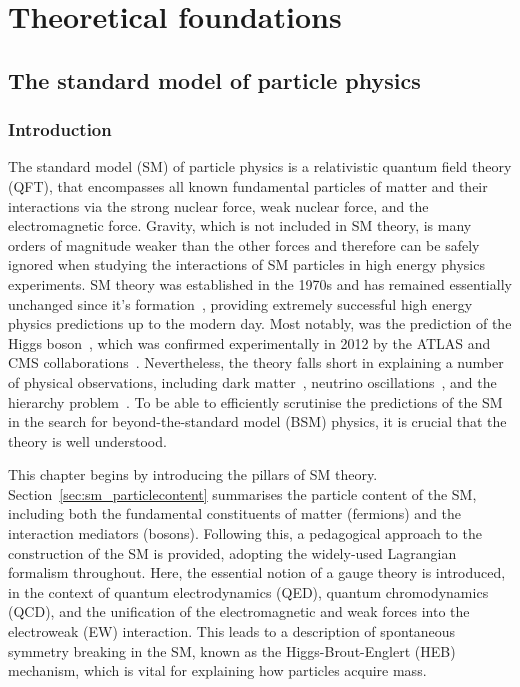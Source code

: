 \chapter{Theoretical foundations}
\label{chap:theory}

\section{The standard model of particle physics}
\subsection{Introduction}

The standard model (SM) of particle physics is a relativistic quantum field theory (QFT), that encompasses all known fundamental particles of matter and their interactions via the strong nuclear force, weak nuclear force, and the electromagnetic force. Gravity, which is not included in SM theory, is many orders of magnitude weaker than the other forces and therefore can be safely ignored when studying the interactions of SM particles in high energy physics experiments. SM theory was established in the 1970s and has remained essentially unchanged since it's formation~\cite{Glashow:1961tr,Weinberg:1967tq,Salam:1968rm}, providing extremely successful high energy physics predictions up to the modern day. Most notably, was the prediction of the Higgs boson~\cite{Englert:1964et,HIGGS1964132,Higgs:1964pj,Guralnik:1964eu,PhysRev.145.1156,PhysRev.155.1554}, which was confirmed experimentally in 2012 by the ATLAS and CMS collaborations~\cite{Aad:2012tfa,Chatrchyan:2012xdj,Chatrchyan:2013lba}. Nevertheless, the theory falls short in explaining a number of physical observations, including dark matter~\cite{Aghanim:2018eyx}, neutrino oscillations~\cite{Fukuda:1998mi}, and the hierarchy problem~\cite{PhysRevD.13.974,PhysRevD.20.2619}. To be able to efficiently scrutinise the predictions of the SM in the search for beyond-the-standard model (BSM) physics, it is crucial that the theory is well understood.

This chapter begins by introducing the pillars of SM theory. Section~\ref{sec:sm_particlecontent} summarises the particle content of the SM, including both the fundamental constituents of matter (fermions) and the interaction mediators (bosons). Following this, a pedagogical approach to the construction of the SM is provided, adopting the widely-used Lagrangian formalism throughout. Here, the essential notion of a gauge theory is introduced, in the context of quantum electrodynamics (QED), quantum chromodynamics (QCD), and the unification of the electromagnetic and weak forces into the electroweak (EW) interaction. This leads to a description of spontaneous symmetry breaking in the SM, known as the Higgs-Brout-Englert (HEB) mechanism, which is vital for explaining how particles acquire mass. 

